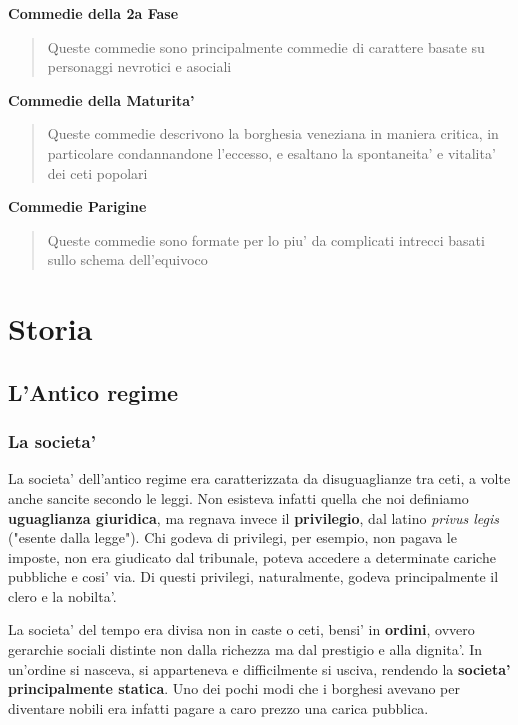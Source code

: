 \documentclass{article}
\begin{document}
{{    \textbf{Commedie della 2a Fase}
    \begin{quote}
      Queste commedie sono principalmente commedie di carattere basate su personaggi nevrotici e asociali
    \end{quote}

    \textbf{Commedie della Maturita'}
    \begin{quote}
      Queste commedie descrivono la borghesia veneziana in maniera critica, in particolare condannandone l'eccesso, e esaltano la spontaneita' e vitalita' dei ceti popolari
    \end{quote}

    \textbf{Commedie Parigine}
    \begin{quote}
      Queste commedie sono formate per lo piu' da complicati intrecci basati sullo schema dell'equivoco
    \end{quote}
  }

  \pagebreak
  \section{Storia}
  {
    \subsection{L'Antico regime}
    \subsubsection{La societa'} %
    La societa' dell'antico regime era caratterizzata da disuguaglianze tra ceti, a volte anche sancite secondo le leggi. Non esisteva infatti quella che noi definiamo \textbf{uguaglianza giuridica}, ma regnava invece il \textbf{privilegio}, dal latino \textit{privus legis} \small{("esente dalla legge")}. Chi godeva di privilegi, per esempio, non pagava le imposte, non era giudicato dal tribunale, poteva accedere a determinate cariche pubbliche e cosi' via. Di questi privilegi, naturalmente, godeva principalmente il clero e la nobilta'.

    La societa' del tempo era divisa non in caste o ceti, bensi' in \textbf{ordini}, ovvero gerarchie sociali distinte non dalla richezza ma dal prestigio e alla dignita'. In un'ordine si nasceva, si apparteneva e difficilmente si usciva, rendendo la \textbf{societa' principalmente statica}. Uno dei pochi modi che i borghesi avevano per diventare nobili era infatti pagare a caro prezzo una carica pubblica.

}}
\end{document}
